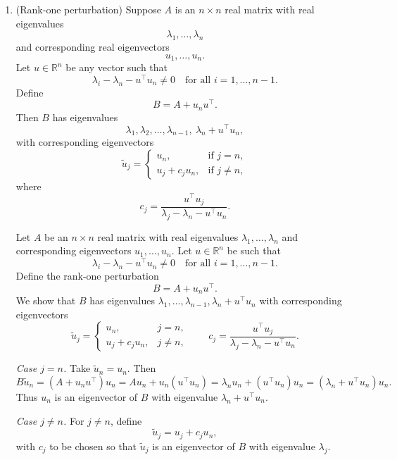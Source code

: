 \documentclass[answers,12pt,addpoints]{exam}
\begin{document}
\begin{enumerate}
\begin{solution}
\medskip
We have therefore decomposed $P$ as
\[
P = U + R,
\]
where $R$ is rank one, $U$ is upper triangular (since $U(i,j)=0$ for $j<i$), and
the diagonal entries of $U$ are
\[
U_{ii} = \sum_{j>i} p_j\left(1 - \frac{w_j}{w_i}\right), \qquad i=1,\dots,n,
\]
as required.
    \end{solution}
    \item (Rank-one perturbation) Suppose $A$ is an $n \times n$ real matrix with real eigenvalues
    \[
    \lambda_1, \ldots, \lambda_n
    \]
    and corresponding real eigenvectors
    \[
    u_1, \ldots, u_n.
    \]
    Let $u \in \mathbb{R}^n$ be any vector such that
    \[
    \lambda_i - \lambda_n - u^\top u_n \neq 0
    \quad \text{for all } i = 1,\ldots, n-1.
    \]
    Define
    \[
    B = A + u_n u^\top.
    \]
    Then $B$ has eigenvalues
    \[
    \lambda_1, \lambda_2, \ldots, \lambda_{n-1},\ \lambda_n + u^\top u_n,
    \]
    with corresponding eigenvectors
    \[
    \tilde{u}_j =
    \begin{cases}
        u_n, & \text{if } j = n,\\[4pt]
        u_j + c_j u_n, & \text{if } j \neq n,
    \end{cases}
    \]
    where
    \[
    c_j = \frac{u^\top u_j}{\lambda_j - \lambda_n - u^\top u_n}.
    \]
    \begin{solution}
Let $A$ be an $n\times n$ real matrix with real eigenvalues
$\lambda_1,\dots,\lambda_n$ and corresponding eigenvectors
$u_1,\dots,u_n$. Let $u\in\mathbb{R}^n$ be such that
\[
\lambda_i - \lambda_n - u^\top u_n \neq 0 \quad \text{for all } i=1,\dots,n-1.
\]
Define the rank-one perturbation
\[
B = A + u_n u^\top.
\]
We show that $B$ has eigenvalues
$\lambda_1,\dots,\lambda_{n-1},\lambda_n + u^\top u_n$ with
corresponding eigenvectors
\[
\tilde u_j =
\begin{cases}
u_n, & j = n,\\[0.3em]
u_j + c_j u_n, & j \neq n,
\end{cases}
\qquad
c_j = \dfrac{u^\top u_j}{\lambda_j - \lambda_n - u^\top u_n}.
\]

\medskip\noindent
\emph{Case $j = n$.}
Take $\tilde u_n = u_n$. Then
\[
B \tilde u_n
= (A + u_n u^\top) u_n
= A u_n + u_n (u^\top u_n)
= \lambda_n u_n + (u^\top u_n) u_n
= (\lambda_n + u^\top u_n) u_n.
\]
Thus $u_n$ is an eigenvector of $B$ with eigenvalue
$\lambda_n + u^\top u_n$.

\medskip\noindent
\emph{Case $j \neq n$.}
For $j \neq n$, define
\[
\tilde u_j = u_j + c_j u_n,
\]
with $c_j$ to be chosen so that $\tilde u_j$ is an eigenvector of $B$
with eigenvalue $\lambda_j$.


\end{solution}
\end{enumerate}
\end{document}
